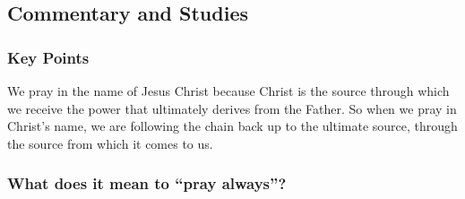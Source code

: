 	
	
	
	
\subsection{Commentary and Studies} %
	\label{PRAYER-COMMENTARY}

	\subsubsection{Key Points}
		\label{PRAYER-KEYS}
	
		\begin{compactitem}
			\item We pray in the name of Jesus Christ because Christ is the source through which we receive the power that ultimately derives from the Father. So when we pray in Christ's name, we are following the chain back up to the ultimate source, through the source from which it comes to us.
		\end{compactitem}
		
	\subsubsection{What does it mean to ``pray always''?}
		\label{PRAYER-always}
		
